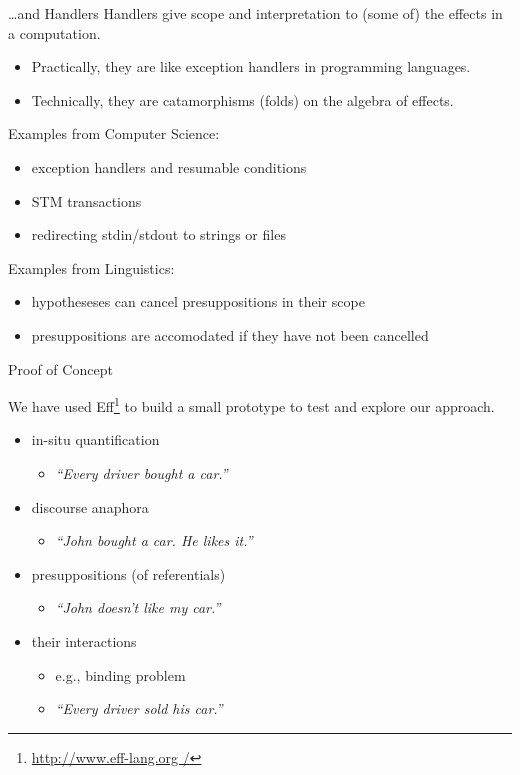 \documentclass{beamer}
\begin{document}
\begin{frame}{\ldots and Handlers}
  Handlers give scope and interpretation to (some of) the effects in a
  computation.

  \begin{itemize}
  \item Practically, they are like exception handlers in programming languages.
  \item Technically, they are catamorphisms (folds) on the algebra of effects.
  \end{itemize}
  

  \pause
  \vfill 

  Examples from Computer Science:
  \begin{itemize}
  \item exception handlers and resumable conditions
  \item STM transactions
  \item redirecting stdin/stdout to strings or files
  \end{itemize}

  \vfill
  \pause
  
  Examples from Linguistics:
  \begin{itemize}
  \item hypotheseses can cancel presuppositions in their scope
  \item presuppositions are accomodated if they have not been cancelled
  \end{itemize}
\end{frame}

\begin{frame}{Proof of Concept}
  \vfill

  We have used Eff\footnote{\url{http://www.eff-lang.org /}} to build a
  small prototype to test and explore our approach.
  
  \vfill
  \begin{itemize}
  \item in-situ quantification
    \begin{itemize}
    \item \textit{``Every driver bought a car.''}
    \end{itemize}
  \item discourse anaphora
    \begin{itemize}
    \item \textit{``John bought a car. He likes it.''}
    \end{itemize}
  \item presuppositions (of referentials)
    \begin{itemize}
    \item \textit{``John doesn't like my car.''}
    \end{itemize}
  \item their interactions
    \begin{itemize}
    \item e.g., binding problem
    \item \textit{``Every driver sold his car.''}
    \end{itemize}
  \end{itemize}
  \vfill
\end{frame}
\end{document}
